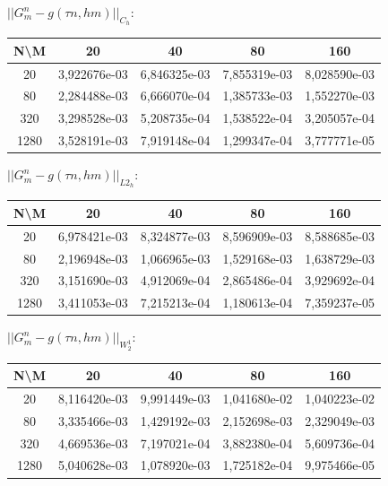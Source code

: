 \documentclass[a4paper, 11pt]{article}
\begin{document}
$||G_m^n - g (\tau n, hm)||_{C_h}$:
\begin{center}
\begin{tabular}{|c|c|c|c|c|}
\hline 
 N\textbackslash M &      20      &      40      &      80      &     160      \\ 
 \hline 
        20         & 3,922676e-03 & 6,846325e-03 & 7,855319e-03 & 8,028590e-03 \\ 
 \hline 
        80         & 2,284488e-03 & 6,666070e-04 & 1,385733e-03 & 1,552270e-03 \\ 
 \hline 
        320        & 3,298528e-03 & 5,208735e-04 & 1,538522e-04 & 3,205057e-04 \\ 
 \hline 
       1280        & 3,528191e-03 & 7,919148e-04 & 1,299347e-04 & 3,777771e-05 \\ 
 \hline 
\end{tabular}
\end{center}
$||G_m^n - g (\tau n, hm)||_{L2_h}$:
\begin{center}
\begin{tabular}{|c|c|c|c|c|}
\hline 
 N\textbackslash M &      20      &      40      &      80      &     160      \\ 
 \hline 
        20         & 6,978421e-03 & 8,324877e-03 & 8,596909e-03 & 8,588685e-03 \\ 
 \hline 
        80         & 2,196948e-03 & 1,066965e-03 & 1,529168e-03 & 1,638729e-03 \\ 
 \hline 
        320        & 3,151690e-03 & 4,912069e-04 & 2,865486e-04 & 3,929692e-04 \\ 
 \hline 
       1280        & 3,411053e-03 & 7,215213e-04 & 1,180613e-04 & 7,359237e-05 \\ 
 \hline 
\end{tabular}
\end{center}
$||G_m^n - g (\tau n, hm)||_{W_2^1}$:
\begin{center}
\begin{tabular}{|c|c|c|c|c|}
\hline 
 N\textbackslash M &      20      &      40      &      80      &     160      \\ 
 \hline 
        20         & 8,116420e-03 & 9,991449e-03 & 1,041680e-02 & 1,040223e-02 \\ 
 \hline 
        80         & 3,335466e-03 & 1,429192e-03 & 2,152698e-03 & 2,329049e-03 \\ 
 \hline 
        320        & 4,669536e-03 & 7,197021e-04 & 3,882380e-04 & 5,609736e-04 \\ 
 \hline 
       1280        & 5,040628e-03 & 1,078920e-03 & 1,725182e-04 & 9,975466e-05 \\ 
 \hline 
\end{tabular}
\end{center}
\end{document}
